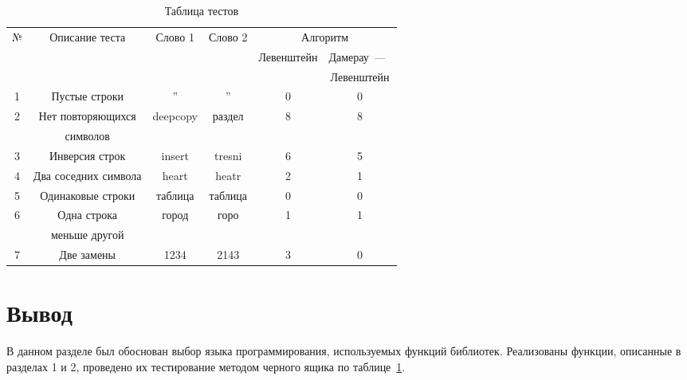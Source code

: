 \begin{table}[H]
	\centering
	\captionsetup{singlelinecheck = false, justification=raggedright}
	\caption{Таблица тестов}
	\label{table:ref1}
	\begin{tabular}{|c|c|c|c|c|c|}
		\hline
		\multirow{3}{*}{№} & \multirow{3}{*}{Описание теста} & \multirow{3}{*}{Слово 1}  &  \multirow{3}{*}{Слово 2}   & \multicolumn{2}{|c|}{Алгоритм}\\ \cline{5-6}
		&                &          &            &\multirow{2}{*}{Левенштейн}   &Дамерау~---~	\\ 
		&                &          &            &             &Левенштейн       	        \\ \hline
		1& Пустые строки  &  ''      &    ''      &   0         &  0 						\\ \hline
		\multirow{2}{*}{2}& Нет повторяющихся & \multirow{2}{*}{deepcopy} & \multirow{2}{*}{раздел} & \multirow{2}{*}{8}   &  \multirow{2}{*}{8}                      
		\\
		& символов        &          &            &             &
		\\ \hline
		3& Инверсия строк & insert   &tresni      &   6         &  5                       \\ \hline
		4& Два соседних символа       & heart    & heatr  & 2   &  1                       \\ \hline
		5& Одинаковые строки          & таблица  & таблица& 0   &  0						\\ \hline
		\multirow{2}{*}{6}& Одна строка &\multirow{2}{*}{город} &\multirow{2}{*}{горо} & \multirow{2}{*}{1} & \multirow{2}{*}{1} \\  
		& меньше другой   &           &           &      &\\ \hline
        7& Две замены          & 1234  & 2143& 3   &  0					\\ \hline
	\end{tabular}
\end{table}
\section*{Вывод}
В данном разделе был обоснован выбор языка программирования, используемых функций библиотек. Реализованы функции, описанные в разделах 1 и 2, проведено их тестирование методом черного ящика по таблице~\ref{table:ref1}. 
